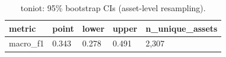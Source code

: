 \begin{table}[t]
\centering
\caption{toniot: 95\% bootstrap CIs (asset-level resampling).}
\label{tab:toniot_bootstrap_ci}
\begin{tabular}{lllll}
\toprule
metric & point & lower & upper & n\_unique\_assets \\
\midrule
macro\_f1 & 0.343 & 0.278 & 0.491 & 2,307 \\
\bottomrule
\end{tabular}
\end{table}
